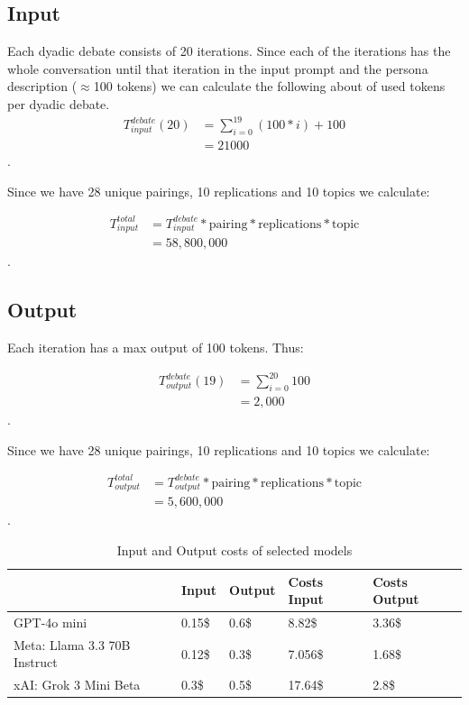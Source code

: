 \documentclass[12pt]{article}
\begin{document}
\begin{multicols}{2}
\subsection{Input}


Each dyadic debate consists of 20 iterations. Since each of the iterations has the whole conversation until that iteration in the input prompt and the persona description ($\approx$100 tokens) we can calculate the following about of used tokens per dyadic debate. 
\begin{align*}
    T^{debate}_{input}(20) &= \sum_{i=0}^{19}(100 * i) + 100 \\
    &= 21000
\end{align*}.

Since we have 28 unique pairings, 10 replications and 10 topics we calculate:

\begin{align*}
    T^{total}_{input} &= T^{debate}_{input} * \text{pairing} *\text{replications} * \text{topic} \\
    &= 58{,}800{,}000
\end{align*}.

\subsection{Output}

Each iteration has a max output of 100 tokens. Thus:


\begin{align*}
    T^{debate}_{output}(19) &= \sum_{i=0}^{20}100 \\
    &= 2{,}000
\end{align*}.

Since we have 28 unique pairings, 10 replications and 10 topics we calculate:

\begin{align*}
    T^{total}_{output} &= T^{debate}_{output} * \text{pairing} *\text{replications} * \text{topic} \\
    &= 5,600,000
\end{align*}.
\end{multicols}


    
\begin{table}[ht!]
\begin{center}

\begin{tabular}{|l|l|l|l|l|}
\hline
                             & Input & Output & Costs Input & Costs Output   \\ \hline
GPT-4o mini                  & 0.15\$  & 0.6\$ & 8.82\$ & 3.36\$   \\\hline
Meta: Llama 3.3 70B Instruct & 0.12\$  & 0.3\$ & 7.056\$ & 1.68\$   \\\hline
xAI: Grok 3 Mini Beta        & 0.3\$   & 0.5\$ & 17.64\$ & 2.8\$ \\ \hline
\end{tabular}
\caption{Input and Output costs of selected models}
\end{center}

\end{table}
\end{document}

